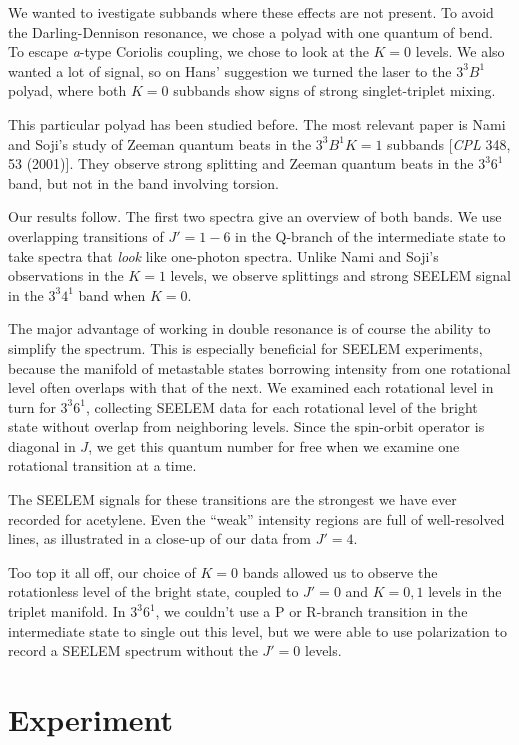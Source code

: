\documentclass[12pt]{mitthesis}
\begin{document}
We wanted to ivestigate subbands where these effects are not present.
To avoid the Darling-Dennison resonance, we chose a polyad with one
quantum of bend.  To escape \emph{a}-type Coriolis coupling, we chose
to look at the $K=0$ levels. We also wanted a lot of signal, so on
Hans' suggestion we turned the laser to the $3^3 B^1$ polyad, where
both $K=0$ subbands show signs of strong singlet-triplet mixing.

This particular polyad has been studied before. The most relevant
paper is Nami and Soji's study of Zeeman quantum beats in the $3^3 B^1
K=1$ subbands [\emph{CPL} 348, 53 (2001)].  They observe strong
splitting and Zeeman quantum beats in the $3^3 6^1$ band, but not in
the band involving torsion.

Our results follow.  The first two spectra give an overview of both
bands.  We use overlapping transitions of $J'=1-6$ in the Q-branch of
the intermediate state to take spectra that \emph{look} like
one-photon spectra.  Unlike Nami and Soji's observations in the $K=1$
levels, we observe splittings and strong SEELEM signal in the $3^3
4^1$ band when $K=0$.

The major advantage of working in double resonance is of course the
ability to simplify the spectrum.  This is especially beneficial for
SEELEM experiments, because the manifold of metastable states
borrowing intensity from one rotational level often overlaps with that
of the next.  We examined each rotational level in turn for $3^3 6^1$,
collecting SEELEM data for each rotational level of the bright state
without overlap from neighboring levels.  Since the spin-orbit
operator is diagonal in $J$, we get this quantum number for free when
we examine one rotational transition at a time.

The SEELEM signals for these transitions are the strongest we have
ever recorded for acetylene.  Even the ``weak'' intensity regions are
full of well-resolved lines, as illustrated in a close-up of our data
from $J'=4$.

Too top it all off, our choice of $K=0$ bands allowed us to observe
the rotationless level of the bright state, coupled to $J'=0$ and
$K=0,1$ levels in the triplet manifold.  In $3^3 6^1$, we couldn't use
a P or R-branch transition in the intermediate state to single out
this level, but we were able to use polarization to record a SEELEM
spectrum without the $J'=0$ levels.


\section{Experiment}
\end{document}
